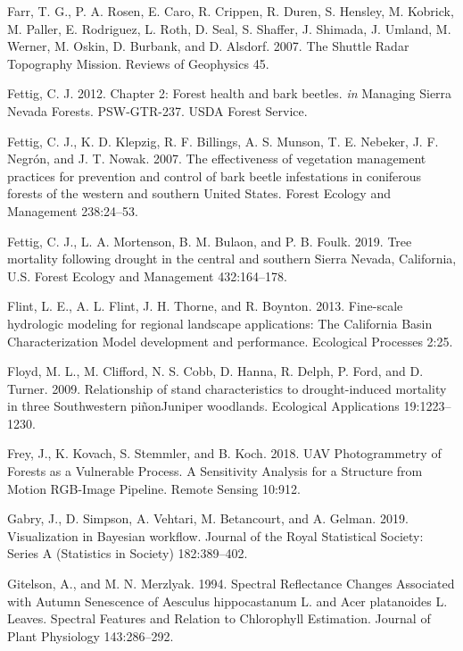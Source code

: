 \documentclass[]{article}
\begin{document}
\hypertarget{ref-farr2007}{}
Farr, T. G., P. A. Rosen, E. Caro, R. Crippen, R. Duren, S. Hensley, M.
Kobrick, M. Paller, E. Rodriguez, L. Roth, D. Seal, S. Shaffer, J.
Shimada, J. Umland, M. Werner, M. Oskin, D. Burbank, and D. Alsdorf.
2007. The Shuttle Radar Topography Mission. Reviews of Geophysics 45.

\hypertarget{ref-fettig2012b}{}
Fettig, C. J. 2012. Chapter 2: Forest health and bark beetles. \emph{in}
Managing Sierra Nevada Forests. PSW-GTR-237. USDA Forest Service.

\hypertarget{ref-fettig2007}{}
Fettig, C. J., K. D. Klepzig, R. F. Billings, A. S. Munson, T. E.
Nebeker, J. F. Negrón, and J. T. Nowak. 2007. The effectiveness of
vegetation management practices for prevention and control of bark
beetle infestations in coniferous forests of the western and southern
United States. Forest Ecology and Management 238:24--53.

\hypertarget{ref-fettig2019}{}
Fettig, C. J., L. A. Mortenson, B. M. Bulaon, and P. B. Foulk. 2019.
Tree mortality following drought in the central and southern Sierra
Nevada, California, U.S. Forest Ecology and Management 432:164--178.

\hypertarget{ref-flint2013}{}
Flint, L. E., A. L. Flint, J. H. Thorne, and R. Boynton. 2013.
Fine-scale hydrologic modeling for regional landscape applications: The
California Basin Characterization Model development and performance.
Ecological Processes 2:25.

\hypertarget{ref-floyd2009}{}
Floyd, M. L., M. Clifford, N. S. Cobb, D. Hanna, R. Delph, P. Ford, and
D. Turner. 2009. Relationship of stand characteristics to
drought-induced mortality in three Southwestern piñonJuniper woodlands.
Ecological Applications 19:1223--1230.

\hypertarget{ref-frey2018}{}
Frey, J., K. Kovach, S. Stemmler, and B. Koch. 2018. UAV Photogrammetry
of Forests as a Vulnerable Process. A Sensitivity Analysis for a
Structure from Motion RGB-Image Pipeline. Remote Sensing 10:912.

\hypertarget{ref-gabry2019}{}
Gabry, J., D. Simpson, A. Vehtari, M. Betancourt, and A. Gelman. 2019.
Visualization in Bayesian workflow. Journal of the Royal Statistical
Society: Series A (Statistics in Society) 182:389--402.

\hypertarget{ref-gitelson1994}{}
Gitelson, A., and M. N. Merzlyak. 1994. Spectral Reflectance Changes
Associated with Autumn Senescence of Aesculus hippocastanum L. and Acer
platanoides L. Leaves. Spectral Features and Relation to Chlorophyll
Estimation. Journal of Plant Physiology 143:286--292.
\end{document}
